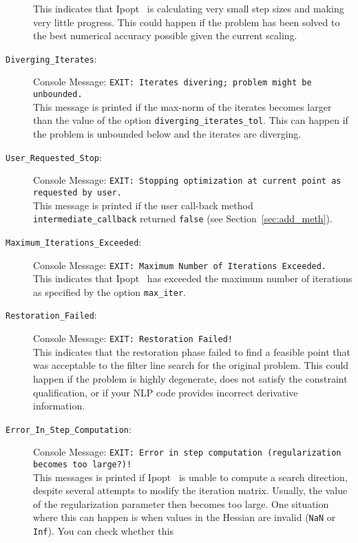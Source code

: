 \documentclass[10pt]{article}
\newcommand{\Ipopt}{{\sc Ipopt }}
\begin{document}
\begin{description}
  This indicates that \Ipopt\ is calculating very small step sizes and
  making very little progress.  This could happen if the problem has
  been solved to the best numerical accuracy possible given the
  current scaling.
\item[{\tt Diverging\_Iterates}:]  $\;$ \\
  Console Message: {\tt EXIT: Iterates divering; problem might be
    unbounded.} \\
  This message is printed if the max-norm of the iterates becomes
  larger than the value of the option {\tt diverging\_iterates\_tol}.
  This can happen if the problem is unbounded below and the iterates
  are diverging.
\item[{\tt User\_Requested\_Stop}:]  $\;$ \\
  Console Message: {\tt EXIT: Stopping optimization at current point
    as requested by user.} \\
  This message is printed if the user call-back method {\tt
    intermediate\_callback} returned {\tt false} (see
  Section~\ref{sec:add_meth}).
\item[{\tt Maximum\_Iterations\_Exceeded}:]  $\;$ \\
  Console Message: {\tt EXIT: Maximum Number of Iterations Exceeded.} \\
  This indicates that \Ipopt\ has exceeded the maximum number of
  iterations as specified by the option {\tt max\_iter}.
\item[{\tt Restoration\_Failed}:]  $\;$ \\
  Console Message: {\tt EXIT: Restoration Failed!} \\
  This indicates that the restoration phase failed to find a feasible
  point that was acceptable to the filter line search for the original
  problem. This could happen if the problem is highly degenerate, does
  not satisfy the constraint qualification, or if your NLP code
  provides incorrect derivative information.
\item[{\tt Error\_In\_Step\_Computation}:]  $\;$ \\
  Console Message: {\tt EXIT: Error in step computation (regularization becomes too large?)!} \\
  This messages is printed if \Ipopt\ is unable to compute a search
  direction, despite several attempts to modify the iteration matrix.
  Usually, the value of the regularization parameter then becomes too
  large.  One situation where this can happen is when values in the
  Hessian are invalid ({\tt NaN} or {\tt Inf}).  You can check whether this

\end{description}
\end{document}
